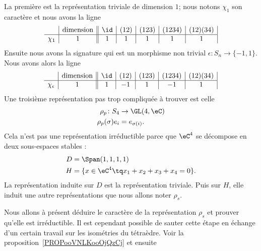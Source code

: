 La première est la représentation triviale de dimension \( 1\); nous notons \( \chi_1\) son caractère et nous avons la ligne
\begin{equation}
    \begin{array}[]{c|c||c|c|c|c|c|}
        &\text{dimension}&\id&(12)&(123)&(1234)&(12)(34)\\
          \hline
          \chi_1&1&1&1&1&1&1\\
    \end{array}
\end{equation}
Ensuite nous avons la signature qui est un morphisme non trivial \( \epsilon\colon S_n\to \{ -1,1 \}\). Nous avons alors la ligne
\begin{equation}    \label{EqGNRavtl}
    \begin{array}[]{c|c||c|c|c|c|c|}
        &\text{dimension}&\id&(12)&(123)&(1234)&(12)(34)\\
          \hline
          \chi_{\epsilon}&1&1&-1&1&-1&1\\
    \end{array}
\end{equation}
Une troisième représentation pas trop compliquée à trouver est celle
\begin{equation}
    \begin{aligned}
        \rho_p\colon S_4&\to \GL(4,\eC) \\
        \rho_p(\sigma)e_i&=e_{\sigma(i)}.
    \end{aligned}
\end{equation}
Cela n'est pas une représentation irréductible parce que \( \eC^4\) se décompose en deux sous-espaces stables :
\begin{subequations}
    \begin{align}
        D&=\Span(1,1,1,1)\\
        H&=\{ x\in\eC^4\tq x_1+x_2+x_3+x_4=0 \}.
    \end{align}
\end{subequations}
La représentation induite sur \( D\) est la représentation triviale. Puis sur \( H\), elle induit une autre représentations que nous allons noter \( \rho_s\).

Nous allons à présent déduire le caractère de la représentation \( \rho_s\) et prouver qu'elle est irréductible. Il est cependant possible de sauter cette étape en échange d'un certain travail sur les isométries du tétraèdre. Voir la proposition~\ref{PROPooVNLKooOjQzCj} et ensuite

